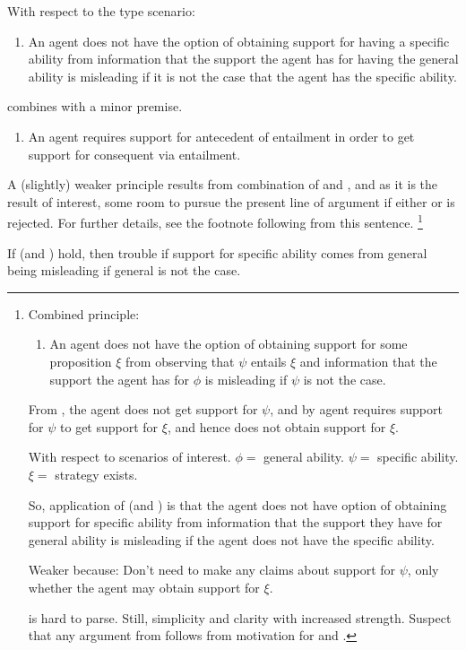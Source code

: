 \begin{note}
  With respect to the type scenario:

  \begin{enumerate}[label=\nI{}, ref=\nI{}]
  \item An agent does not have the option of obtaining support for having a specific ability from information that the support the agent has for having the general ability is misleading if it is not the case that the agent has the specific ability.
  \end{enumerate}


  \nI{} combines with a minor premise.
  \begin{enumerate}[label=\nI{}, ref=\nI{}]
  \item An agent requires support for antecedent of entailment in order to get support for consequent via entailment.
  \end{enumerate}
  A (slightly) weaker principle results from combination of \nI{} and \nIm{}, and as it is the result of interest, some room to pursue the present line of argument if either \nI{} or \nIm{} is rejected.
  For further details, see the footnote following from this sentence.
  \footnote{
    Combined principle:
    \begin{enumerate}[label=\nIp{}, ref=\nIp{}]
    \item\label{prem:ni:p} An agent does not have the option of obtaining support for some proposition \(\xi\) from observing that \(\psi\) entails \(\xi\) and information that the support the agent has for \(\phi\) is misleading if \(\psi\) is not the case.
    \end{enumerate}
    From \nI{}, the agent does not get support for \(\psi\), and by \nIm{} agent requires support for \(\psi\) to get support for \(\xi\), and hence does not obtain support for \(\xi\).

    With respect to scenarios of interest.
    \(\phi = \) general ability.
    \(\psi = \) specific ability.
    \(\xi = \) strategy exists.

    So, application of \nI{} (and \nIm{}) is that the agent does not have option of obtaining support for specific ability from information that the support they have for general ability is misleading if the agent does not have the specific ability.

    Weaker because: Don't need to make any claims about support for \(\psi\), only whether the agent may obtain support for \(\xi\).

    \nIp{} is hard to parse.
    Still, simplicity and clarity with increased strength.
    Suspect that any argument from \nIp{} follows from motivation for \nI{} and \nIm{}.
  }

  If \nI{} (and \nIm{}) hold, then trouble if support for specific ability comes from general being misleading if general is not the case.
\end{note}

